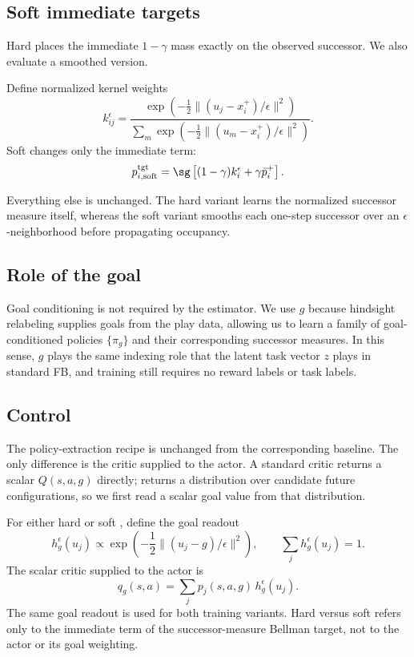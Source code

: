 \subsection{Soft immediate targets}

Hard \DensityFB{} places the immediate $1-\gamma$ mass exactly on the observed successor.
We also evaluate a smoothed version.

Define normalized kernel weights
\begin{equation}
k_{ij}^{\epsilon} = \frac{ \exp\!\left( -\frac12 \|(u_j-x_i^+)/\epsilon\|^2 \right)}{ \sum_m \exp\!\left( -\frac12 \|(u_m-x_i^+)/\epsilon\|^2 \right)
}.
\end{equation}
Soft \DensityFB{} changes only the immediate term:
\begin{equation}
\label{eq:soft-target}
    p_{i,\mathrm{soft}}^{\mathrm{tgt}} = \sg\left[ (1-\gamma)k_i^\epsilon + \gamma\bar p_i^+\right].
\end{equation}

Everything else is unchanged.
The hard variant learns the normalized successor measure itself, whereas the soft variant smooths each one-step successor over an $\epsilon$-neighborhood before propagating occupancy.

\subsection{Role of the goal}

Goal conditioning is not required by the \DensityFB{} estimator.
We use $g$ because hindsight relabeling supplies goals from the play data, allowing us to learn a family of goal-conditioned policies $\{\pi_g\}$ and their corresponding successor measures.
In this sense, $g$ plays the same indexing role that the latent task vector $z$ plays in standard FB, and training still requires no reward labels or task labels.

\subsection{Control}

The policy-extraction recipe is unchanged from the corresponding baseline.
The only difference is the critic supplied to the actor.
A standard critic returns a scalar $Q(s,a,g)$ directly; \DensityFB{} returns a distribution over candidate future configurations, so we first read a scalar
goal value from that distribution.

For either hard or soft \DensityFB{}, define the goal readout
\begin{equation} 
    h_g^\epsilon(u_j) \propto \exp\!\left( -\frac12 \|(u_j-g)/\epsilon\|^2 \right), \qquad \sum_j h_g^\epsilon(u_j)=1.
\end{equation}
The scalar critic supplied to the actor is
\begin{equation}
\label{eq:goal-readout}
    q_g(s,a) = \sum_j p_j(s,a,g)\, h_g^\epsilon(u_j).
\end{equation}
The same goal readout is used for both training variants.
Hard versus soft refers only to the immediate term of the successor-measure
Bellman target, not to the actor or its goal weighting.

